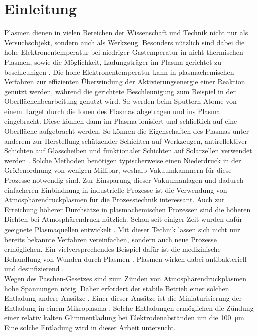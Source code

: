 \chapter{Einleitung}

Plasmen dienen in vielen Bereichen der Wissenschaft und Technik nicht nur als Versuchsobjekt, sondern auch als Werkzeug. Besonders nützlich sind dabei die hohe Elektronentemperatur bei niedriger Gastemperatur in nicht-thermischen Plasmen, sowie die Möglichkeit, Ladungsträger im Plasma gerichtet zu beschleunigen \cite{liebermanPrinciplesPlasmaDischarges1994a,pielPlasmaPhysicsIntroduction2010,chenIntroductionPlasmaPhysics1984}. Die hohe Elektronentemperatur kann in plasmachemischen Verfahren zur effizienten Überwindung der Aktivierungsenergie einer Reaktion genutzt werden, während die gerichtete Beschleunigung zum Beispiel in der Oberflächenbearbeitung genutzt wird. So werden beim Sputtern Atome von einem Target durch die Ionen des Plasmas abgetragen und ins Plasma eingebracht. Diese können dann im Plasma ionisiert und schließlich auf eine Oberfläche aufgebracht werden. So können die Eigenschaften des Plasmas unter anderem zur Herstellung schützender Schichten auf Werkzeugen, antireflektiver Schichten auf Glasscheiben und funktionaler Schichten auf Solarzellen verwendet werden \cite{weltmannFuturePlasmaScience2019,martinHandbookDepositionTechnologies2009}. Solche Methoden benötigen typischerweise einen Niederdruck in der Größenordnung von wenigen Millibar, weshalb Vakuumkammern für diese Prozesse notwendig sind. Zur Einsparung dieser Vakuumanlagen und dadurch einfacheren Einbindnung in industrielle Prozesse ist die Verwendung von Atmosphärendruckplasmen für die Prozesstechnik interessant. Auch zur Erreichung höherer Durchsätze in plasmachemischen Prozessen sind die höheren Dichten bei Atmosphärendruck nützlich. Schon seit einiger Zeit wurden dafür geeignete Plasmaquellen entwickelt \cite{winterAtmosphericPressurePlasma2015,bruggemanFoundationsAtmosphericPressure2017,tenderoAtmosphericPressurePlasmas2006}. Mit dieser Technik lassen sich nicht nur bereits bekannte Verfahren vereinfachen, sondern auch neue Prozesse ermöglichen. Ein vielversprechendes Beispiel dafür ist die medizinische Behandlung von Wunden durch Plasmen \cite{vonwoedtkePlasmasMedicine2013,gravesLowTemperaturePlasma2014a}. Plasmen wirken dabei antibakteriell und desinfizierend \cite{schneiderRoleVUVRadiation2012}.\\

Wegen des Paschen-Gesetzes sind zum Zünden von Atmosphärendruckplasmen hohe Spannungen nötig. Daher erfordert der stabile Betrieb einer solchen Entladung andere Ansätze \cite{bruggemanFoundationsAtmosphericPressure2017}. Einer dieser Ansätze ist die Miniaturisierung der Entladung in einem Mikroplasma \cite{bruggemanAtmosphericPressureDischarge2013}. Solche Entladungen ermöglichen die Zündung einer relativ kalten Glimmentladung bei Elektrodenabständen um die \qty{100}{\um}. Eine solche Entladung wird in dieser Arbeit untersucht.\\

